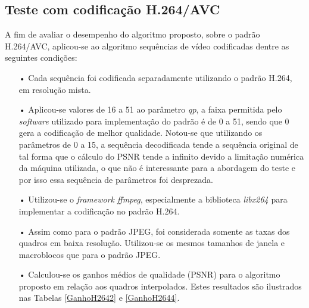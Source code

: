 \subsection{Teste com codificação H.264/AVC}

A fim de avaliar o desempenho do algoritmo proposto, sobre o padrão H.264/AVC, aplicou-se ao algoritmo sequências de vídeo codificadas dentre as seguintes condições:
\begin{itemize}
 \setlength\itemsep{1cm}
\item[•] Cada sequência foi codificada separadamente utilizando o padrão H.264, em resolução mista. 
\item[•] Aplicou-se valores de 16 a 51 ao parâmetro  \textit{qp}, a faixa permitida pelo \textit{software} utilizado para implementação do padrão é de 0 a 51, sendo que 0 gera a codificação de melhor qualidade. Notou-se que utilizando os parâmetros de 0 a 15, a sequência decodificada tende a sequência original de tal forma que o cálculo do PSNR tende a infinito devido a limitação numérica da máquina utilizada, o que não é interessante para a abordagem do teste e por isso essa sequência de parâmetros foi desprezada. 
\item[•] Utilizou-se o \textit{framework ffmpeg}, especialmente a biblioteca \textit{libx264} para implementar a codificação no padrão H.264.
\item[•] Assim como para o padrão JPEG, foi considerada somente as taxas dos quadros em baixa resolução. Utilizou-se os mesmos tamanhos de janela e macroblocos que para o padrão JPEG.
\item[•] Calculou-se os ganhos médios \cite{bjontegaard2001calcuation} de qualidade (PSNR) para o algoritmo proposto em relação aos quadros interpolados. Estes resultados são ilustrados nas Tabelas \ref{GanhoH2642} e \ref{GanhoH2644}.
\end{itemize}

